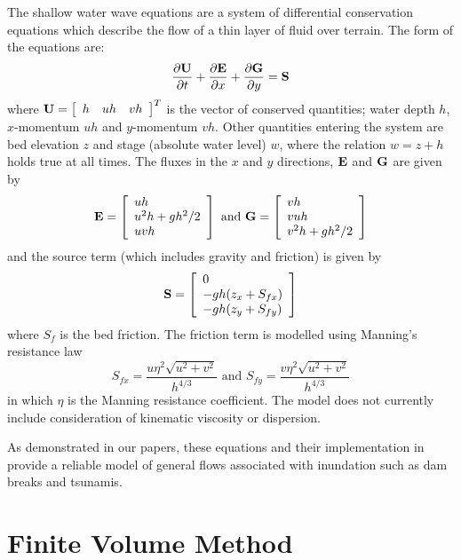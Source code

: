 \documentclass{manual}
\begin{document}
The shallow water wave equations are a system of differential
conservation equations which describe the flow of a thin layer of
fluid over terrain. The form of the equations are:
\[
\frac{\partial \mathbf{U}}{\partial t}+\frac{\partial \mathbf{E}}{\partial
x}+\frac{\partial \mathbf{G}}{\partial y}=\mathbf{S}
\]
where $\UU=\left[ {{\begin{array}{*{20}c}
 h & {uh} & {vh} \\
\end{array} }} \right]^T$ is the vector of conserved quantities; water depth
$h$, $x$-momentum $uh$ and $y$-momentum $vh$. Other quantities
entering the system are bed elevation $z$ and stage (absolute water
level) $w$, where the relation $w = z + h$ holds true at all times.
The fluxes in the $x$ and $y$ directions, $\mathbf{E}$ and $\mathbf{G}$ are given
by
\[
\EE=\left[ {{\begin{array}{*{20}c}
 {uh} \hfill \\
 {u^2h+gh^2/2} \hfill \\
 {uvh} \hfill \\
\end{array} }} \right]\mbox{ and }\GG=\left[ {{\begin{array}{*{20}c}
 {vh} \hfill \\
 {vuh} \hfill \\
 {v^2h+gh^2/2} \hfill \\
\end{array} }} \right]
\]
and the source term (which includes gravity and friction) is given
by
\[
\SSS=\left[ {{\begin{array}{*{20}c}
 0 \hfill \\
 -{gh(z_{x} + S_{fx} )} \hfill \\
 -{gh(z_{y} + S_{fy} )} \hfill \\
\end{array} }} \right]
\]
where $S_f$ is the bed friction. The friction term is modelled using
Manning's resistance law
\[
S_{fx} =\frac{u\eta ^2\sqrt {u^2+v^2} }{h^{4/3}}\mbox{ and }S_{fy}
=\frac{v\eta ^2\sqrt {u^2+v^2} }{h^{4/3}}
\]
in which $\eta$ is the Manning resistance coefficient.
The model does not currently include consideration of kinematic viscosity or dispersion.

As demonstrated in our papers, \cite{ZR1999,nielsen2005} these
equations and their implementation in \anuga provide a reliable
model of general flows associated with inundation such as dam breaks
and tsunamis.


\section{Finite Volume Method}
\label{sec:fvm}
\end{document}
